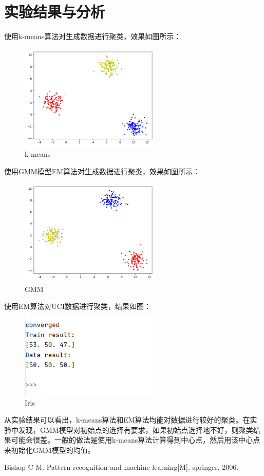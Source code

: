 \documentclass[a4paper,11pt,UTF8]{ctexart}
\newcommand{\bottomcaption}{%
\setlength{\abovecaptionskip}{6pt}%
\setlength{\belowcaptionskip}{6pt}%
\caption}
\begin{document}
\section{实验结果与分析}
使用k-means算法对生成数据进行聚类，效果如图所示： \\
\begin{figure}[H]
  \centering
  \includegraphics[width=0.6\textwidth]{kmeans.png}
  \bottomcaption{k-means}
\end{figure}
使用GMM模型EM算法对生成数据进行聚类，效果如图所示：\\
\begin{figure}[H]
  \centering
  \includegraphics[width=0.6\textwidth]{gmm.png}
  \bottomcaption{GMM}
\end{figure}
使用EM算法对UCI数据进行聚类，结果如图：\\
\begin{figure}[H]
  \centering
  \includegraphics[width=0.6\textwidth]{uci.png}
  \bottomcaption{Iris}
\end{figure}
从实验结果可以看出，k-means算法和EM算法均能对数据进行较好的聚类。在实验中发现，GMM模型对初始点的选择有要求，如果初始点选择地不好，则聚类结果可能会很差。一般的做法是使用k-means算法计算得到中心点，然后用该中心点来初始化GMM模型的均值。
\begin{thebibliography}{99} 
Bishop C M. Pattern recognition and machine learning[M]. springer, 2006.
\end{thebibliography}
\end{document}
